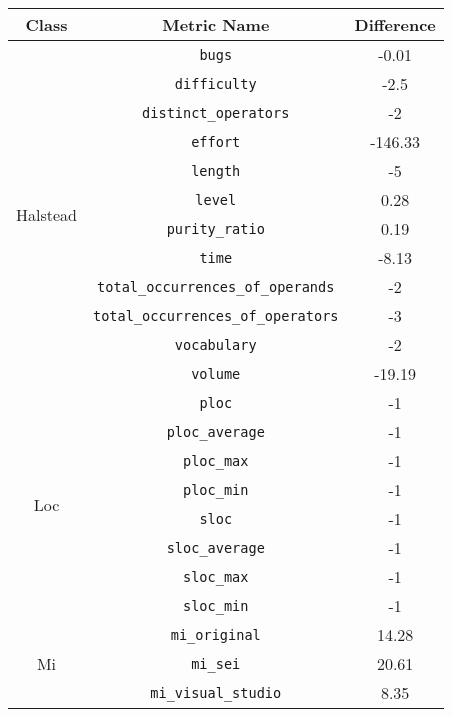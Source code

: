 \begin{center}
  \begin{tabular}{ |c|c|c| }
    \hline

    Class & Metric Name                           & Difference \\

    \hline

    \multirow{ 12 }{6em}{ Halstead }
          & \verb|bugs|                           & -0.01      \\
          & \verb|difficulty|                     & -2.5       \\
          & \verb|distinct_operators|             & -2         \\
          & \verb|effort|                         & -146.33    \\
          & \verb|length|                         & -5         \\
          & \verb|level|                          & 0.28       \\
          & \verb|purity_ratio|                   & 0.19       \\
          & \verb|time|                           & -8.13      \\
          & \verb|total_occurrences_of_operands|  & -2         \\
          & \verb|total_occurrences_of_operators| & -3         \\
          & \verb|vocabulary|                     & -2         \\
          & \verb|volume|                         & -19.19     \\
    \hline
    \multirow{ 8 }{6em}{ Loc }
          & \verb|ploc|                           & -1         \\
          & \verb|ploc_average|                   & -1         \\
          & \verb|ploc_max|                       & -1         \\
          & \verb|ploc_min|                       & -1         \\
          & \verb|sloc|                           & -1         \\
          & \verb|sloc_average|                   & -1         \\
          & \verb|sloc_max|                       & -1         \\
          & \verb|sloc_min|                       & -1         \\
    \hline
    \multirow{ 3 }{6em}{ Mi }
          & \verb|mi_original|                    & 14.28      \\
          & \verb|mi_sei|                         & 20.61      \\
          & \verb|mi_visual_studio|               & 8.35       \\
    \hline
  \end{tabular}
\end{center}
